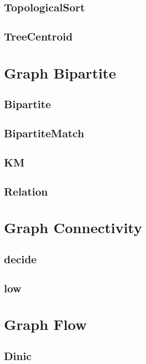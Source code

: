 \subsection{TopologicalSort}

\subsection{TreeCentroid}


\section{Graph Bipartite}

\subsection{Bipartite}

\subsection{BipartiteMatch}

\subsection{KM}

\subsection{Relation}


\section{Graph Connectivity}
\subsection{decide}

\subsection{low}


\section{Graph Flow}

\subsection{Dinic}

